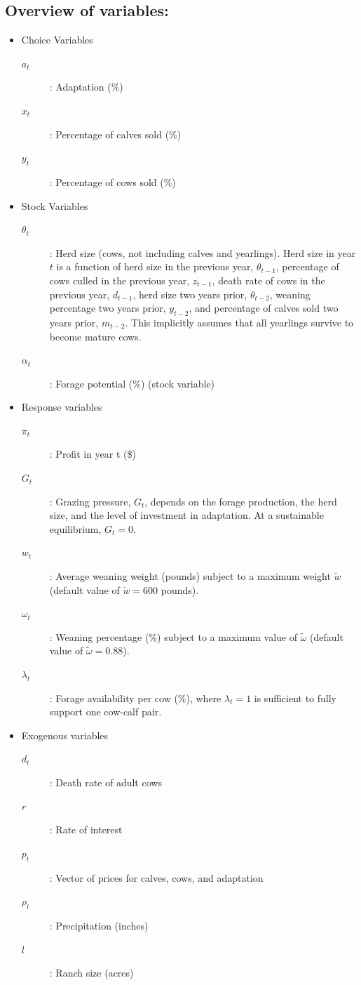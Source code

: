 \documentclass[11pt]{article}
\begin{document}
\subsection{Overview of variables:}
\begin{itemize}

\item Choice Variables
\begin{description}
\item[$a_t$]: Adaptation (\%)
\item[$x_t$]: Percentage of calves sold (\%)
\item[$y_t$]: Percentage of cows sold (\%)
\end{description}

\item Stock Variables
\begin{description}
\item[$\theta_t$]: Herd size (cows, not including calves and yearlings). Herd size in year $t$ is a function of herd size in the previous year, $\theta_{t-1}$, percentage of cows culled in the previous year, $z_{t-1}$, death rate of cows in the previous year, $d_{t-1}$, herd size two years prior, $\theta_{t-2}$, weaning percentage two years prior, $y_{t-2}$, and percentage of calves sold two years prior, $m_{t-2}$. This implicitly assumes that all yearlings survive to become mature cows.
\item[$\alpha_t$]: Forage potential (\%) (stock variable)
\end{description}

\item Response variables
\begin{description}
\item[$\pi_t$]: Profit in year t (\$)
\item[$G_t$]: Grazing pressure, $G_t$, depends on the forage production, the herd size, and the level of investment in adaptation. 
At a sustainable equilibrium, $G_t = 0$. 
\item[$w_t$]: Average weaning weight (pounds) subject to a maximum weight $\tilde{w}$ (default value of $\tilde{w}= 600$ pounds).
\item[$\omega_t$]: Weaning percentage (\%) subject to a maximum value of $\tilde{\omega}$ (default value of $\tilde{\omega}=0.88$).
\item[$\lambda_t$]: Forage availability per cow (\%), where $\lambda_t = 1$ is sufficient to fully support one cow-calf pair.
\end{description}

\item Exogenous variables
\begin{description}
\item[$d_t$]: Death rate of adult cows
\item[$r$]: Rate of interest
\item[$p_t$]: Vector of prices for calves, cows, and adaptation
\item[$\rho_t$]: Precipitation (inches)
\item[$l$]: Ranch size (acres)
\end{description}

\end{itemize}
\end{document}
